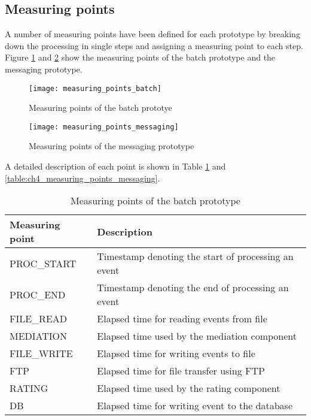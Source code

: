 \subsection{Measuring points}
A number of measuring points have been defined for each prototype by breaking down the processing in single steps and assigning a measuring point to each step. Figure \ref{fig:ch4_measuring_points_batch} and \ref{fig:ch4_measuring_points_messaging} show the measuring points of the batch prototype and the messaging prototype. 

\begin{figure}[htpb]
	\centering
	\texttt{[image: measuring\_points\_batch]}
	\caption{Measuring points of the batch prototye}
	\label{fig:ch4_measuring_points_batch}
\end{figure}

\begin{figure}[htpb]
	\centering
	\texttt{[image: measuring\_points\_messaging]}
	\caption{Measuring points of the messaging prototype}
	\label{fig:ch4_measuring_points_messaging}
\end{figure}

A detailed description of each point is shown in Table \ref{table:ch4_measuring_points_batch} and \ref{table:ch4_measuring_points_messaging}.

\begin{table}
	\caption{Measuring points of the batch prototype}
	\label{table:ch4_measuring_points_batch}
	\centering
	\begin{tabular}{|l|p{5cm}|}
		\hline
		\bfseries Measuring point & \bfseries Description\\
		\hline
		PROC\_START & Timestamp denoting the start of processing an event\\
		\hline
		PROC\_END & Timestamp denoting the end of processing an event\\
		\hline
		FILE\_READ & Elapsed time for reading events from file\\
		\hline
		MEDIATION & Elapsed time used by the mediation component\\
		\hline
		FILE\_WRITE & Elapsed time for writing events to file\\
		\hline
		FTP & Elapsed time for file transfer using FTP\\
		\hline
		RATING & Elapsed time used by the rating component\\
		\hline
		DB & Elapsed time for writing event to the database\\
		\hline 
	\end{tabular}
\end{table}

